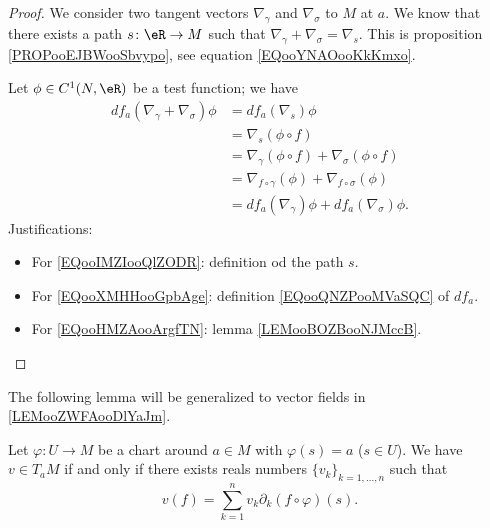 \begin{proof}
    We consider two tangent vectors \( \nabla_{\gamma}\) and \( \nabla_{\sigma}\) to \( M\) at \( a\). We know that there exists a path \( s\colon \eR\to M\) such that \( \nabla_{\gamma}+\nabla_{\sigma}=\nabla_s\). This is proposition \ref{PROPooEJBWooSbvypo}, see equation \eqref{EQooYNAOooKkKmxo}.

    Let \( \phi\in C^1(N,\eR)\) be a test function; we have
    \begin{subequations}
        \begin{align}
            df_a(\nabla_{\gamma}+\nabla_{\sigma})\phi&=df_a(\nabla_s)\phi  \label{EQooIMZIooQlZODR}\\
            &=\nabla_s(\phi\circ f)     \label{EQooXMHHooGpbAge}\\
            &=\nabla_{\gamma}(\phi\circ f)+\nabla_{\sigma}(\phi\circ f)\\
            &=\nabla_{f\circ \gamma}(\phi)+\nabla_{f\circ \sigma}(\phi)     \label{EQooHMZAooArgfTN}\\
            &=df_a(\nabla_{\gamma})\phi+df_a(\nabla_{\sigma})\phi.
        \end{align}
    \end{subequations}
    Justifications:
    \begin{itemize}
        \item For \eqref{EQooIMZIooQlZODR}: definition od the path \( s\).
        \item For \eqref{EQooXMHHooGpbAge}: definition \eqref{EQooQNZPooMVaSQC} of \( df_a\).
        \item For \eqref{EQooHMZAooArgfTN}: lemma \ref{LEMooBOZBooNJMccB}.
    \end{itemize}
\end{proof}


The following lemma will be generalized to vector fields in \ref{LEMooZWFAooDlYaJm}.
\begin{lemma}       \label{LEMooSCVHooYPiGse}
    Let \( \varphi\colon U\to M\) be a chart around \( a\in M\) with \( \varphi(s)=a\) (\( s\in U\)). We have \( v\in T_aM\) if and only if there exists reals numbers \( \{ v_k \}_{k=1,\ldots, n}\) such that
    \begin{equation}        \label{EQooNEDSooOhyrCZ}
        v(f)=\sum_{k=1}^nv_k\partial_k(f\circ \varphi)(s).
    \end{equation}
\end{lemma}

